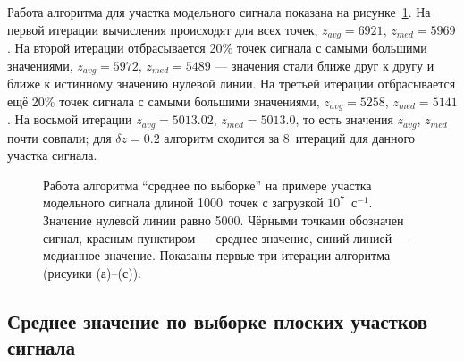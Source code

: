 Работа алгоритма для участка модельного сигнала показана на рисунке~\ref{fig:baselineMethodAvgOverSet}. На первой итерации вычисления происходят для всех точек, $z_{avg} = 6921$, $z_{med} = 5969$. На второй итерации отбрасывается 20\% точек сигнала с самыми большими значениями, $z_{avg} = 5972$, $z_{med} = 5489$ --- значения стали ближе друг к другу и ближе к истинному значению нулевой линии. На третьей итерации отбрасывается ещё 20\% точек сигнала с самыми большими значениями, $z_{avg} = 5258$, $z_{med} = 5141$. На восьмой итерации $z_{avg} = 5013.02$, $z_{med} = 5013.0$, то есть значения $z_{avg}$, $z_{med}$ почти совпали; для $\delta z = 0.2$ алгоритм сходится за 8~итераций для данного участка сигнала.~\cite{Khilkevitch2020}

\begin{figure}[ht!]
  \caption{ Работа алгоритма ``среднее по выборке'' на примере участка модельного сигнала длиной 1000~точек с загрузкой $10^7$~с${}^{-1}$. Значение нулевой линии равно 5000. Чёрными точками обозначен сигнал, красным пунктиром --- среднее значение, синий линией --- медианное значение. Показаны первые три итерации алгоритма (рисуики (а)--(с)).~\cite{Khilkevitch2020}}
  \label{fig:baselineMethodAvgOverSet}
\end{figure}


\FloatBarrier
\subsection{Среднее значение по выборке плоских участков сигнала}

